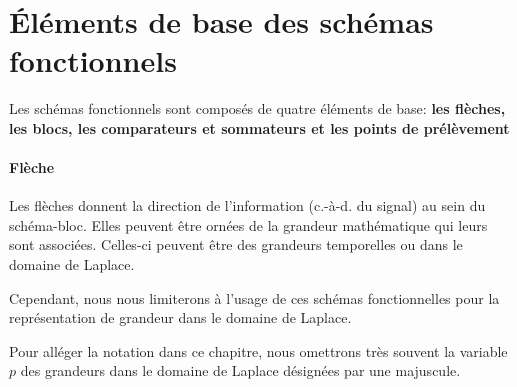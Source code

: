 \section{\'Eléments de base des schémas fonctionnels}
Les schémas fonctionnels sont composés de quatre éléments de base:
\textbf{les flèches, les blocs, les comparateurs et sommateurs et les points 
de prélèvement}
\paragraph{Flèche}
Les flèches donnent la direction de l'information (c.-à-d. du signal) au sein 
du schéma-bloc. Elles peuvent être ornées de la grandeur mathématique qui 
leurs sont associées. 
Celles-ci peuvent être des grandeurs temporelles ou dans le domaine de Laplace. 
\begin{center}

\end{center}
Cependant, nous nous limiterons à l'usage de ces schémas fonctionnelles pour la 
représentation de grandeur dans le domaine de Laplace.

Pour alléger la notation dans ce chapitre, nous omettrons 
très souvent la variable $p$ des grandeurs dans le domaine de Laplace désignées 
par une majuscule.
